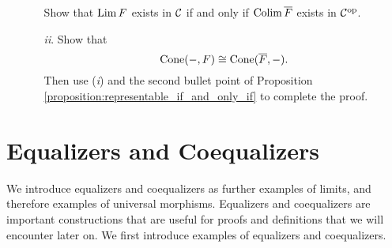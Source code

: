 \begin{itemize}
\begin{itemize}
            Show that $\operatorname*{\mathrm{Lim }} F$ exists in $\mathcal{C}$ if and only if
            $\operatorname*{\mathrm{Colim }} \overline{F}$ exists in $\mathcal{C}^{\mathrm{op}}$.

            \item[\emph{ii}.]
            Show that
            \[
                \operatorname{\mathrm{Cone}}(-, F) \cong \operatorname{\mathrm{Cone}}(\overline{F}, -).
            \]
            Then use (\emph{i}) and the second bullet point of 
            Proposition \ref{proposition:representable_if_and_only_if}
            to complete the proof.
        \end{itemize}
    \end{itemize}






    \newpage
    \section{Equalizers and Coequalizers}
    We introduce equalizers and coequalizers as
    further examples of limits, and therefore examples of universal 
    morphisms. Equalizers and coequalizers are important constructions 
    that are useful for proofs and definitions that we will encounter 
    later on. We first introduce examples of equalizers and coequalizers. 

